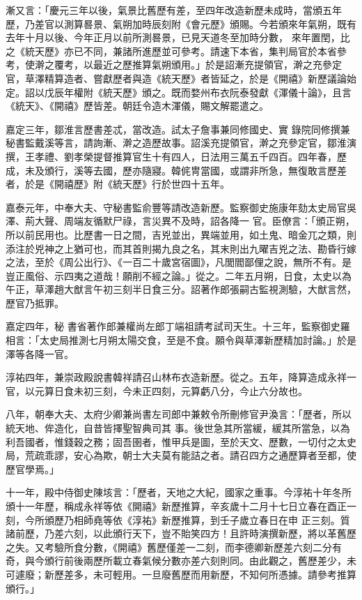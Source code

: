 \begin{pinyinscope}
 漸又言：「慶元三年以後，氣景比舊歷有差，至四年改造新歷未成時，當頒五年歷，乃差官以測算晷景、氣朔加時辰刻附《會元歷》頒賜。今若頒來年氣朔，既有去年十月以後、今年正月以前所測晷景，已見天道冬至加時分數，
 來年置閏，比之《統天歷》亦已不同，兼諸所進歷並可參考。請速下本省，集判局官於本省參考，使澣之覆考，以最近之歷推算氣朔頒用。」於是詔漸充提領官，澣之充參定官，草澤精算造者、嘗獻歷者與造《統天歷》者皆延之，於是《開禧》新歷議論始定。詔以戊辰年權附《統天歷》頒之。既而婺州布衣阮泰發獻《渾儀十論》，且言《統天》、《開禧》歷皆差。朝廷令造木渾儀，賜文解罷遣之。



 嘉定三年，鄒淮言歷書差忒，當改造。試太子詹事兼同修國史、實
 錄院同修撰兼秘書監戴溪等言，請詢漸、澣之造歷故事。詔溪充提領官，澣之充參定官，鄒淮演撰，王孝禮、劉孝榮提督推算官生十有四人，日法用三萬五千四百。四年春，歷成，未及頒行，溪等去國，歷亦隨寢。韓侂冑當國，或謂非所急，無復敢言歷差者，於是《開禧歷》附《統天歷》行於世四十五年。



 嘉泰元年，中奉大夫、守秘書監俞豐等請改造新歷。監察御史施康年劾太史局官吳澤、荊大聲、周端友循默尸祿，言災異不及時，詔各降一
 官。臣僚言：「頒正朔，所以前民用也。比歷書一日之間，吉兇並出，異端並用，如土鬼、暗金兀之類，則添注於兇神之上猶可也，而其首則揭九良之名，其末則出九曜吉兇之法、勘昏行嫁之法，至於《周公出行》、《一百二十歲宮宿圖》，凡閭閻鄙俚之說，無所不有。是豈正風俗、示四夷之道哉！願削不經之論。」從之。二年五月朔，日食，太史以為午正，草澤趙大猷言午初三刻半日食三分。詔著作郎張嗣古監視測驗，大猷言然，歷官乃抵罪。



 嘉定四年，秘
 書省著作郎兼權尚左郎丁端祖請考試司天生。十三年，監察御史羅相言：「太史局推測七月朔太陽交食，至是不食。願令與草澤新歷精加討論。」於是澤等各降一官。



 淳祐四年，兼崇政殿說書韓祥請召山林布衣造新歷。從之。五年，降算造成永祥一官，以元算日食未初三刻，今未正四刻，元算虧八分，今止六分故也。



 八年，朝奉大夫、太府少卿兼尚書左司郎中兼敕令所刪修官尹渙言：「歷者，所以統天地、侔造化，自昔皆擇聖智典司其
 事。後世急其所當緩，緩其所當急，以為利吾國者，惟錢穀之務；固吾圉者，惟甲兵是圖，至於天文、歷數，一切付之太史局，荒疏乖謬，安心為欺，朝士大夫莫有能詰之者。請召四方之通歷算者至都，使歷官學焉。」



 十一年，殿中侍御史陳垓言：「歷者，天地之大紀，國家之重事。今淳祐十年冬所頒十一年歷，稱成永祥等依《開禧》新歷推算，辛亥歲十二月十七日立春在酉正一刻，今所頒歷乃相師堯等依《淳祐》新歷推算，到壬子歲立春日在申
 正三刻。質諸前歷，乃差六刻，以此頒行天下，豈不貽笑四方！且許時演撰新歷，將以革舊歷之失。又考驗所食分數，《開禧》舊歷僅差一二刻，而李德卿新歷差六刻二分有奇，與今頒行前後兩歷所載立春氣候分數亦差六刻則同。由此觀之，舊歷差少，未可遽廢；新歷差多，未可輕用。一旦廢舊歷而用新歷，不知何所憑據。請參考推算頒行。」




\end{pinyinscope}
